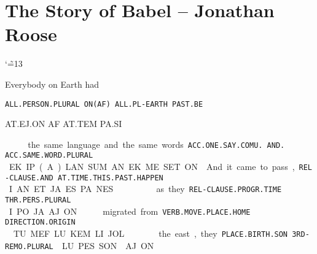 \setlength{\parindent}{0pt}
\section{The Story of Babel -- {\small Jonathan Roose}}
{
\renewcommand{\glyphkernright}{-0.25em}
\renewcommand{\glyphkernleft}{-0.15em}
\catcode`\~=13\def\~{\hspace{0.4cm}}
\baselineskip

Everybody		on 	Earth 		had

{\tt ALL.PERSON.PLURAL   	ON(AF)	ALL.PL-EARTH	PAST.BE	 }

AT.EJ.ON		AF	AT.TEM		PA.SI	 

\at\ej\on	~	\af~	\at\tem		~\pa\si	 

\vspace{0.2cm}

the same language	 and 	the same words. 

{\tt ACC.ONE.SAY.COMU.	AND.	ACC.SAME.WORD.PLURAL }

EK.IP.(A).LAN.SUM	AN	EK.ME.SET.ON

\vspace{0.5cm}

And	 		it came to pass, 			  

{\tt REL-CLAUSE.AND            AT.TIME.THIS.PAST.HAPPEN 		}

I.AN			ET.JA.ES.PA.NES				 

\Atlani\an                   ~ \et\ja\es\pa\nes

\def\drie{\vspace{0.45cm}}
\drie

as	they	    

{\tt REL-CLAUSE.PROGR.TIME	THR.PERS.PLURAL }

I.PO.JA	.AJ.ON 

\Atlani\po\ja	~\aj\on 


migrated          			from      		 

{\tt VERB.MOVE.PLACE.HOME	DIRECTION.ORIGIN	 }

\def\spak{\hspace{0.2cm}}
TU.MEF.LU.KEM LI.JOL 

\tu\mef\lu\kem\spak ~ \li\jol

 

the east, 		they 		 

{\tt PLACE.BIRTH.SON	3RD-REMO.PLURAL }

LU.PES.SON \spak		AJ.ON 

\lu\pes\son ~ \spak \aj\on

}
